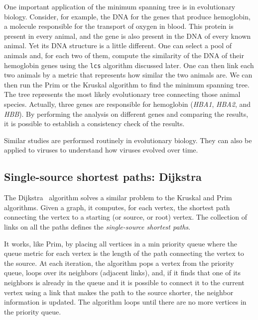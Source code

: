\documentclass[justified, sixbynine]{tufte-book}
\def\ft{\small\tt}
\theoremstyle{plain}%
\newtheorem * {corollary}{Corollary}
\theoremstyle{definition}
\theoremstyle{remark}
\newtheorem * {remark}{Remark}
\newtheorem * {note}{Note}
\begin{document}
\begin{fullwidth}
One important application of the minimum spanning tree is in evolutionary biology. Consider, for example, the DNA for the genes that produce hemoglobin, a molecule responsible for the transport of oxygen in blood. This protein is present in every animal, and the gene is also present in the DNA of every known animal. Yet its DNA structure is a little different. One can select a pool of animals and, for each two of them, compute the similarity of the DNA of their hemoglobin genes using the {\ft lcs} algorithm discussed later. One can then link each two animals by a metric that represents how similar the two animals are. We can then run the Prim or the Kruskal algorithm to find the minimum spanning tree. The tree represents the most likely evolutionary tree connecting those animal species. Actually, three genes are responsible for hemoglobin ({\it HBA1}, {\it HBA2}, and {\it HBB}). By performing the analysis on different genes and comparing the results, it is possible to establish a consistency check of the results.~\cite{evolutionary}

Similar studies are performed routinely in evolutionary biology. They can also be applied to viruses to understand how viruses evolved over time.~\cite{korber}

\subsection{Single-source shortest paths: Dijkstra}


The Dijkstra~\cite{dijkstra} algorithm solves a similar problem to the Kruskal and Prim algorithms. Given a graph, it computes, for each vertex, the shortest path connecting the vertex to a starting (or source, or root) vertex. The collection of links on all the paths defines the {\it single-source shortest paths}.

It works, like Prim, by placing all vertices in a min priority queue where the queue metric for each vertex is the length of the path connecting the vertex to the source. At each iteration, the algorithm pops a vertex from the priority queue, loops over its neighbors (adjacent links), and, if it finds that one of its neighbors is already in the queue and it is possible to connect it to the current vertex using a link that makes the path to the source shorter, the neighbor information is updated. The algorithm loops until there are no more vertices in the priority queue.


\end{fullwidth}
\end{document}
